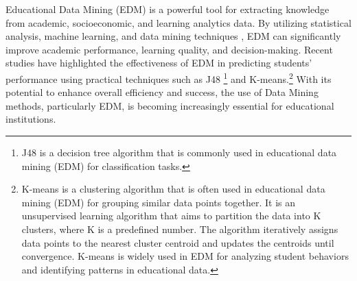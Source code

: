 Educational Data Mining (EDM) is a powerful tool for extracting knowledge from academic, socioeconomic, and
learning analytics data. By utilizing statistical analysis, machine learning, and data mining techniques \citep{hooda_integrating_2022, arifin_using_2022},
EDM can significantly improve academic performance, learning quality, and decision-making. Recent studies have
highlighted the effectiveness of EDM in predicting students' performance using practical techniques such as J48 \footnote{J48 is a decision tree algorithm that is commonly used in
	educational data mining (EDM) for classification tasks.} and K-means.\footnote{ K-means is a clustering algorithm that is often used in educational data mining
	(EDM) for grouping similar data points together. It is an unsupervised learning algorithm that aims to partition the data into K clusters, where K is a predefined number.
	The algorithm iteratively assigns data points to the nearest cluster centroid and updates the centroids until convergence.
	K-means is widely used in EDM for analyzing student behaviors and identifying patterns in educational data.}
With its potential to enhance overall efficiency and success\citep{prince_sattam_bin_abdulaziz_university_state_2016},
the use of Data Mining methods, particularly EDM, is becoming increasingly essential for educational institutions.


